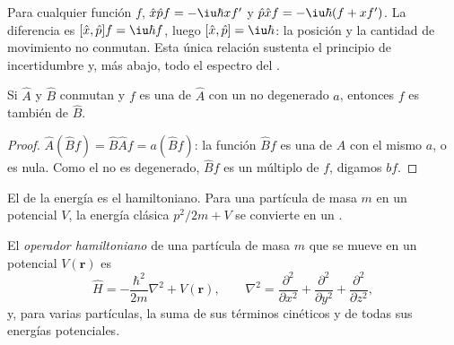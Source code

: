 \begin{example}\label{ex:b3:quantum-model-systems:canonical}
Para cualquier función $f$, $\hat x\hat pf = -\iu\hbar xf'$ y $\hat p\hat xf =
-\iu\hbar(f + xf')$. La diferencia es $[\hat x,\hat p]f = \iu\hbar f$, luego
$[\hat x,\hat p] = \iu\hbar$: la posición y la cantidad de movimiento no conmutan. Esta
única relación sustenta el principio de incertidumbre y, más abajo, todo el
espectro del .
\end{example}

\begin{proposition}\label{prop:b3:quantum-model-systems:commuting}
Si $\hat A$ y $\hat B$ conmutan y $f$ es una  de $\hat A$
con un  no degenerado $a$, entonces $f$ es también  de
$\hat B$.
\end{proposition}

\begin{proof}
$\hat A(\hat Bf) = \hat B\hat Af = a(\hat Bf)$: la función $\hat Bf$ es una
 de $\hat A$ con el mismo  $a$, o es nula. Como el
 no es degenerado, $\hat Bf$ es un múltiplo de $f$, digamos $bf$.
\end{proof}

El  de la energía es el hamiltoniano. Para una partícula de masa $m$ en un
potencial $V$, la energía clásica $p^2/2m + V$ se convierte en un .

\begin{definition}\label{def:b3:quantum-model-systems:schrodinger}
El \emph{operador hamiltoniano} de una partícula de
masa $m$ que se mueve en un potencial $V(\mathbf r)$ es
\[
\hat H = -\frac{\hbar^2}{2m}\nabla^2 + V(\mathbf r), \qquad \nabla^2 =
\frac{\partial^2}{\partial x^2} + \frac{\partial^2}{\partial y^2} +
\frac{\partial^2}{\partial z^2},
\]
y, para varias partículas, la suma de sus términos cinéticos y de todas sus
energías potenciales.
\end{definition}

